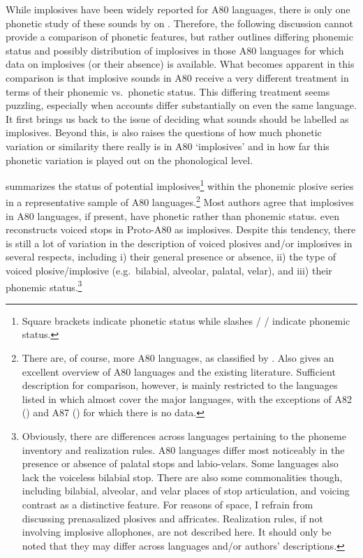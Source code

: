 \documentclass[output=paper]{LSP/langsci}
\begin{document}
While implosives have been widely reported for  A80 languages, there is only one phonetic study of these sounds by \citet{Nagano2012} on . Therefore, the following discussion cannot provide a comparison of phonetic features, but rather outlines differing phonemic status and possibly distribution of implosives in those A80 languages for which data on implosives (or their absence) is available. What becomes apparent in this comparison is that implosive sounds in A80 receive a very different treatment in terms of their phonemic vs.\ phonetic status. This differing treatment seems puzzling, especially when accounts differ substantially on even the same language. It first brings us back to the issue of deciding what sounds should be labelled as implosives. Beyond this,  is also raises the questions of how much phonetic variation or similarity there really is in A80 `implosives' and in how far this phonetic variation is played out on the phonological level.



 summarizes the status of potential implosives\footnote{Square brackets indicate phonetic status while slashes / / indicate phonemic status.} within the phonemic plosive series in a representative sample of A80 languages.\footnote{There are, of course, more A80 languages, as classified by \citet{Maho2009}. Also \citet{Cheucle2014} gives an excellent overview of A80 languages and the existing literature. Sufficient description for comparison, however, is mainly restricted to the languages listed in  which almost cover the major languages, with the exceptions of A82 () and A87 () for which there is no data.}
Most authors agree that implosives in A80 languages, if present, have phonetic rather than phonemic status. \citet[461]{Cheucle2014} even reconstructs voiced stops in Proto-A80 as implosives.
 Despite this tendency, there is still a lot of variation in the description of voiced plosives and/or implosives in several respects, including i) their general presence or absence, ii) the type of voiced plosive/implosive (e.g.\ bilabial, alveolar, palatal, velar), and iii) their phonemic status.\footnote{Obviously, there are differences across languages pertaining to the phoneme inventory and realization rules.  A80 languages differ most noticeably in the presence or absence of palatal stops and labio-velars. Some languages also lack the voiceless bilabial stop. There are also some commonalities though, including bilabial, alveolar, and velar places of stop articulation, and voicing contrast as a distinctive feature. For reasons of space, I refrain from discussing prenasalized plosives and affricates.  Realization rules, if not involving implosive allophones, are not described here. It should only be noted that they may differ across languages and/or authors' descriptions.}
\end{document}
